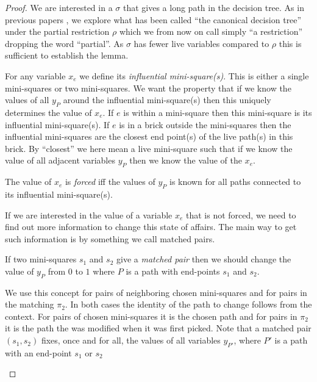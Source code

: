 \documentclass{theoretics}
\begin{document}
\begin{proof}
We are interested
in a $\sigma$ that gives a long path in the decision tree.
As in previous papers \cite{jhtseitin}, \cite{jhkr}
we explore what has been called ``the canonical decision tree''
 under the partial  restriction $\rho$ which
we from now on call simply ``a restriction'' dropping
the word ``partial''.  As $\sigma$ has fewer live
variables compared to $\rho$ this is sufficient to
establish the lemma.

For any variable $x_e$ we define its {\em influential mini-square(s)}.
This is either a single mini-squares or two mini-squares.
We want the property that if we know the values of all $y_P$
around the influential mini-square(s) then this uniquely
determines the value of $x_e$.
If $e$ is within a mini-square then this mini-square
is its influential mini-square(s).  If $e$ is in a brick outside
the mini-squares then the influential mini-squares are the
closest end point(s) of the live path(s) in this brick.
By ``closest'' we here mean a live mini-square such that
if we know the value of all adjacent variables $y_P$ then
we know the value of the $x_e$.

\begin{definition}
The value of $x_e$ is {\em forced} iff the values
of $y_P$ is known for all paths connected
to its influential mini-square(s).
\end{definition}

If we are interested in the value of a variable $x_e$ that
is not forced, we need to find out more information to
change this state of affairs.  The main way to get such information is
by something we call matched pairs.

\begin{definition}
If two mini-squares $s_1$ and $s_2$ give a {\em matched pair} 
then we should change the value of $y_P$ from $0$ to
$1$ where $P$ is a path with end-points
$s_1$ and $s_2$.
\end{definition}

\begin{remark}
We use this concept for pairs of neighboring chosen mini-squares
and for pairs in the matching $\pi_2$.  In both cases
the identity of the path to change follows from the context.
For pairs of chosen mini-squares it is the chosen path
and for pairs in $\pi_2$ it is the path the was modified
when it was first picked.
Note that a matched pair $(s_1,s_2)$
fixes, once and for all, the values of all variables $y_{P'}$,
 where $P'$ is a path with an end-point $s_1$ or $s_2$
\end{remark}


\end{proof}
\end{document}
